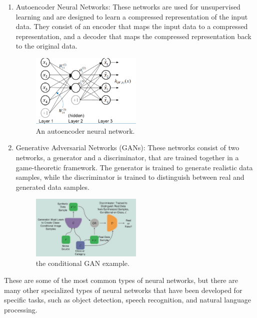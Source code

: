 \begin{enumerate}
    \item Autoencoder Neural Networks: These networks are used for unsupervised learning and are designed to learn a compressed
    representation of the input data. They consist of an encoder that maps the input data to a compressed representation, and a decoder
    that maps the compressed representation back to the original data.
    \begin{center}
        \begin{figure}[!ht]
            \centering
            \includegraphics[width=0.5\textwidth]{figures/ann}
            \caption{An autoencoder neural network. \cite{luo2018distributed}}
            \label{fig:ann}
        \end{figure}
    \end{center}
    \item Generative Adversarial Networks (GANs): These networks consist of two networks, a generator and a discriminator,
    that are trained together in a game-theoretic framework. The generator is trained to generate realistic data samples, while the discriminator is
    trained to distinguish between real and generated data samples.
    \begin{center}
        \begin{figure}[!ht]
            \centering
            \includegraphics[width=0.5\textwidth]{figures/gan}
            \caption{the conditional GAN example. \cite{creswell2018generative}}
            \label{fig:ann}
        \end{figure}
    \end{center}
\end{enumerate}
These are some of the most common types of neural networks, but there are many other specialized types of neural networks that have been
developed for specific tasks, such as object detection, speech recognition, and natural language processing.\\
